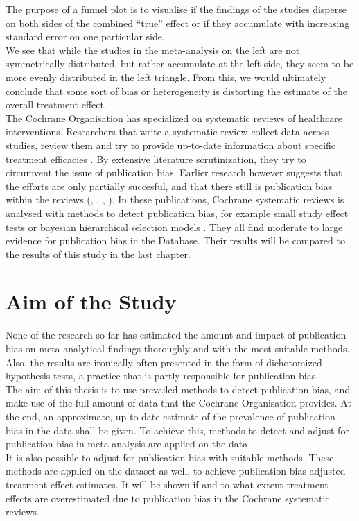 \documentclass[11pt,a4paper,twoside]{book}\usepackage[]{graphicx}\usepackage[]{color}
\begin{document}
The purpose of a funnel plot is to visualise if the findings of the studies disperse on both sides of the combined ``true'' effect or if they accumulate with increasing standard error on one particular side.\\
We see that while the studies in the meta-analysis on the left are not symmetrically distributed, but rather accumulate at the left side, they seem to be more evenly distributed in the left triangle. From this, we would ultimately conclude that some sort of bias or heterogeneity is distorting the estimate of the overall treatment effect.\\
The Cochrane Organisation has specialized on systematic reviews of healthcare interventions. Researchers that write a systematic review collect data across studies, review them and try to provide up-to-date information about specific treatment efficacies \citep{cochrane.handbook}. By extensive literature scrutinization, they try to circumvent the issue of publication bias. %
Earlier research however suggests that the efforts are only partially succesful, and that there still is publication bias within the reviews (\citet{Egger}, \citet{Ioannidis2007}, \citet{kicinsky}, \citet{vanAert.2019}). In these publications, Cochrane systematic reviews is analysed with methods to detect publication bias, for example small study effect tests or bayesian hierarchical selection models \citep{kicinsky}. They all find moderate to large evidence for publication bias in the Database. Their results will be compared to the results of this study in the last chapter.\\

\section{Aim of the Study}
None of the research so far has estimated the amount and impact of publication bias on meta-analytical findings thoroughly and with the most suitable methods. Also, the results are ironically often presented in the form of dichotomized hypothesis tests, a practice that is partly responsible for publication bias.\\
The aim of this thesis is to use prevailed methods to detect publication bias, and make use of the full amount of data that the Cochrane Organisation provides. At the end, an approximate, up-to-date estimate of the prevalence of publication bias in the data shall be given. To achieve this, methods to detect and adjust for publication bias in meta-analysis are applied on the data. \\
It is also possible to adjust for publication bias with suitable methods. These methods are applied on the dataset as well, to achieve publication bias adjusted treatment effect estimates. It will be shown if and to what extent treatment effects are overestimated due to publication bias in the Cochrane systematic reviews.
\end{document}
